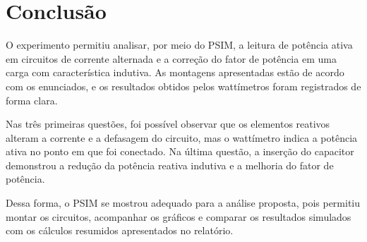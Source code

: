 \documentclass[12pt,a4paper]{article}
\begin{document}
\newpage
\section*{Conclusão}

O experimento permitiu analisar, por meio do PSIM, a leitura de potência ativa em circuitos de corrente alternada e a correção do fator de potência em uma carga com característica indutiva. As montagens apresentadas estão de acordo com os enunciados, e os resultados obtidos pelos wattímetros foram registrados de forma clara.

Nas três primeiras questões, foi possível observar que os elementos reativos alteram a corrente e a defasagem do circuito, mas o wattímetro indica a potência ativa no ponto em que foi conectado. Na última questão, a inserção do capacitor demonstrou a redução da potência reativa indutiva e a melhoria do fator de potência.

Dessa forma, o PSIM se mostrou adequado para a análise proposta, pois permitiu montar os circuitos, acompanhar os gráficos e comparar os resultados simulados com os cálculos resumidos apresentados no relatório.
\end{document}
